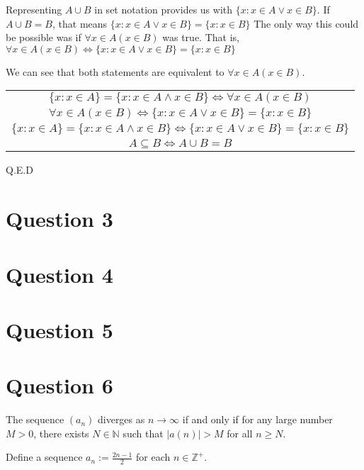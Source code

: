 \documentclass{article}
\begin{document}
Representing $A \cup B$ in set notation provides us with $\{x : x \in A \lor x \in B\}$. If $A \cup B = B$, that means $\{x : x \in A \lor x \in B\} = \{x : x \in B\}$ The only way this could be possible was if $\forall x \in A (x \in B)$ was true. That is, $\forall x \in A (x \in B) \iff \{x : x \in A \lor x \in B\} = \{x : x \in B\}$

We can see that both statements are equivalent to $\forall x \in A (x \in B)$.

\begin{center}
\begin{tabular}{c}
$\{x : x \in A\} = \{x : x \in A \land x \in B\} \iff \forall x \in A (x \in B)$ \\
$\forall x \in A (x \in B) \iff \{x : x \in A \lor x \in B\} = \{x : x \in B\}$\\
$\{x : x \in A\} = \{x : x \in A \land x \in B\} \iff \{x : x \in A \lor x \in B\} = \{x : x \in B\}$ \\
${A \subseteq B \iff A \cup B = B}$
\end{tabular}
\end{center}
Q.E.D
\newpage


\section{Question 3}

\newpage

\section{Question 4}

\newpage

\section{Question 5}

\newpage

\section{Question 6}
\begin{definition}
The sequence $(a_n)$ diverges as $n \rightarrow \infty$ if and only if for any large number $M > 0$, there exists $N \in \mathbb{N}$ such that $|a(n)| > M$ for all $n \geq N$.
\end{definition}

Define a sequence $a_n := \frac{2n-1}{2}$ for each $n \in \mathbb{Z}^+$.
\end{document}
